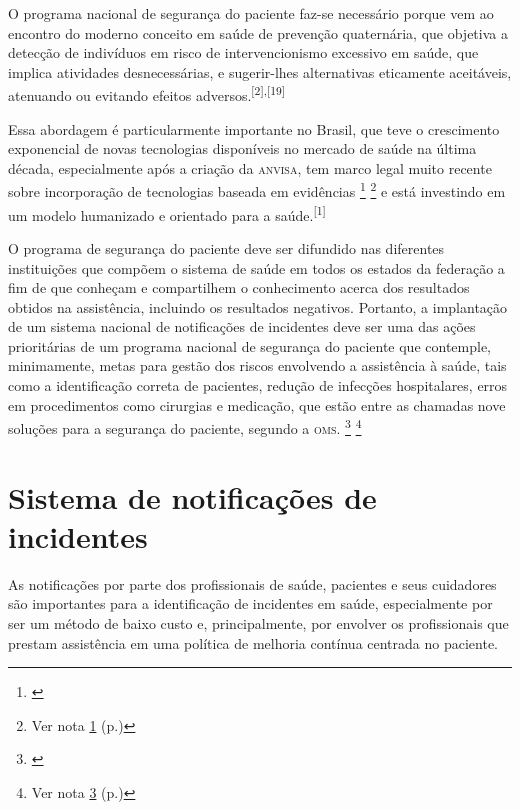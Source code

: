 \documentclass{article}
\newcounter{fn1}
\newcounter{fn2}
\newcounter{fn3}
\newcounter{fn4}
\newcounter{fn5}
\newcounter{fn6}
\newcounter{fn7}
\newcounter{fn8}
\begin{document}
O programa nacional de segurança do paciente faz-se necessário porque vem ao
encontro do
moderno conceito em saúde de prevenção quaternária, que objetiva a detecção de
indivíduos em
risco de intervencionismo excessivo em saúde, que implica atividades
desnecessárias, e
sugerir-lhes alternativas eticamente aceitáveis, atenuando ou evitando efeitos
adversos.\textsuperscript{[}\textsuperscript{2}\textsuperscript{]}\textsuperscript{,}\textsuperscript{[}\textsuperscript{19}\textsuperscript{]}

Essa abordagem é particularmente importante no Brasil, que teve o crescimento
exponencial
de novas tecnologias disponíveis no mercado de saúde na última década,
especialmente após a
criação da \textsc{anvisa}, tem marco legal muito recente sobre incorporação de
tecnologias baseada
em evidências%
		{\footnote{ \label{ftn:fn7}}}%
		{\footnote{Ver nota \ref{ftn:fn7} (p.\pageref{ftn:fn7})}}
e está investindo em um modelo humanizado e orientado para a saúde.\textsuperscript{[}\textsuperscript{1}\textsuperscript{]}

O programa de segurança do paciente deve ser difundido nas diferentes
instituições que
compõem o sistema de saúde em todos os estados da federação a fim de que
conheçam e
compartilhem o conhecimento acerca dos resultados obtidos na assistência,
incluindo os
resultados negativos. Portanto, a implantação de um sistema nacional de
notificações de
incidentes deve ser uma das ações prioritárias de um programa nacional de
segurança do
paciente que contemple, minimamente, metas para gestão dos riscos envolvendo a
assistência à
saúde, tais como a identificação correta de pacientes, redução de infecções
hospitalares,
erros em procedimentos como cirurgias e medicação, que estão entre as chamadas
nove soluções
para a segurança do paciente, segundo a \textsc{oms}.%
		{\footnote{ \label{ftn:fn8}}}%
		{\footnote{Ver nota \ref{ftn:fn8} (p.\pageref{ftn:fn8})}}

\section{Sistema de notificações de incidentes}

As notificações por parte dos profissionais de saúde, pacientes e seus
cuidadores são
importantes para a identificação de incidentes em saúde, especialmente por ser
um método de
baixo custo e, principalmente, por envolver os profissionais que prestam
assistência em uma
política de melhoria contínua centrada no paciente.
\end{document}
